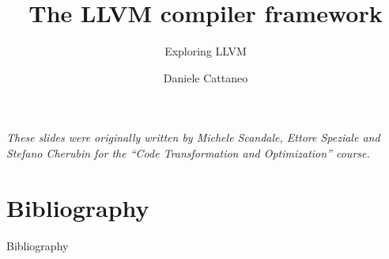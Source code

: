 

\author{Daniele Cattaneo}
\date{\DATE}
\title{The LLVM compiler framework}
\subtitle{Exploring LLVM}
\newcommand{\customdata}{Daniele Cattaneo <daniele.cattaneo@polimi.it>}






\begin{frame}
\maketitle
\begin{center}
\itshape\scriptsize
These slides were originally written by
Michele Scandale, Ettore Speziale and Stefano Cherubin for the
``Code Transformation and Optimization'' course.
\end{center}
\end{frame}








\section{Bibliography}
\begin{frame}[allowframebreaks]{Bibliography}
\nocite{*}


\end{frame}

